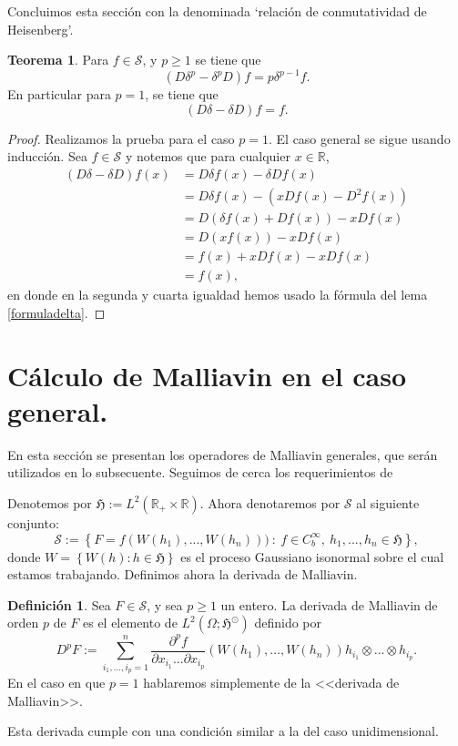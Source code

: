 \documentclass[letterpaper,twoside,12pt]{book}
\newcommand{\R}{\mathbb{R}}
\renewcommand{\S}{\mathcal{S}}
\newcommand{\1}{\mathds{1}}
\theoremstyle{definition}
\newtheorem{dfn}{Definición}
\theoremstyle{definition}
\newtheorem{teo}{Teorema}
\theoremstyle{remark}
\theoremstyle{definition}
\theoremstyle{definition}
\theoremstyle{definition}
\theoremstyle{definition}
\theoremstyle{definition}
\begin{document}
Concluimos esta sección con la denominada `relación de conmutatividad de Heisenberg'.
\begin{teo} 
 Para $f\in \S$, y $p\geq1$ se tiene que 
 \[
    (D\delta^p-\delta^p D)f=p\delta^{p-1}f.
 \]
 En particular para $p=1$, se tiene que
 \[
 (D\delta-\delta D)f=f.
 \]
 \end{teo}
\begin{proof} 
   Realizamos la prueba para el caso $p=1$. El caso general se sigue usando inducción. Sea $f\in \S$ y notemos que para cualquier $x\in \R$, 
\begin{align*}
   (D\delta-\delta D)f(x)&=D\delta f(x) - \delta D f(x)\\
   &=D \delta f(x) - (xDf(x)-D^2f(x))\\
   &=D \left(\delta f(x)+Df(x)\right) -xDf(x)\\
   &=D \left(xf(x)\right)-xDf(x)\\
   &=f(x)+xDf(x)-xDf(x)\\
   &=f(x),
\end{align*}
en donde en la segunda y cuarta igualdad hemos usado la fórmula del lema \ref{formuladelta}.
 \end{proof}
\section{Cálculo de Malliavin en el caso general.}

En esta sección se presentan los operadores de Malliavin generales, que serán utilizados en lo subsecuente. Seguimos de cerca los requerimientos de \cite[sección 2.1]{KUZGUN202268}

Denotemos por $\mathfrak{H}:=L^2(\R_+\times\R)$. Ahora denotaremos por $\S$ al siguiente conjunto:
\[
\S:=\left\{F=f(W(h_1),...,W(h_n))) \ : \ f\in C^{\infty}_b, \ h_1,...,h_n\in \mathfrak{H} \right\},
\]
donde $W=\left\{W(h):h\in \mathfrak{H}\right\}$ es el proceso Gaussiano isonormal sobre el cual estamos trabajando. Definimos ahora la derivada de Malliavin.
\begin{dfn} 
 Sea $F\in \S$, y sea $p\geq1$ un entero. La derivada de Malliavin de orden $p$ de $F$ es el elemento de $L^2(\Omega;\mathfrak{H}^{\odot})$ definido por 
 \[
 D^pF:=\sum_{i_1,...,i_p=1}^{n}\frac{\partial^pf}{\partial x_{i_1}...\partial x_{i_p}}(W(h_1),...,W(h_n))h_{i_1}\otimes...\otimes h_{i_p}.
 \] 
 En el caso en que $p=1$ hablaremos simplemente de la <<derivada de Malliavin>>.
 \end{dfn}
 Esta derivada cumple con una condición similar a la del caso unidimensional.
\end{document}
